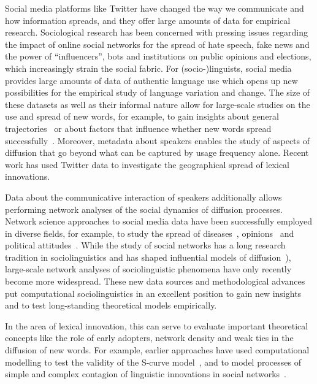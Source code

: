 \documentclass[
  a4paper,
  abstract=on,
  captions=tableabove
  ]{scrartcl}
\begin{document}
Social media platforms like Twitter have changed the way we communicate and how information spreads, and they offer large amounts of data for empirical research. Sociological research has been concerned with pressing issues regarding the impact of online social networks for the spread of hate speech, fake news and the power of \enquote{influencers}, bots and institutions on public opinions and elections, which increasingly strain the social fabric. For (socio-)linguists, social media provides large amounts of data of authentic language use which opens up new possibilities for the empirical study of language variation and change. The size of these datasets as well as their informal nature allow for large-scale studies on the use and spread of new words, for example, to gain insights about general trajectories~\parencite{Nini2017ApplicationGrowth} or about factors that influence whether new words spread successfully~\parencite{Grieve2018NaturalSelection}. Moreover, metadata about speakers enables the study of aspects of diffusion that go beyond what can be captured by usage frequency alone. Recent work has used Twitter data to investigate the geographical spread of lexical innovations.~\parencite{Eisenstein2014DiffusionLexical,Grieve2017GeographicalPatterns,Grieve2018MappingLexical}

Data about the communicative interaction of speakers additionally allows performing network analyses of the social dynamics of diffusion processes. Network science approaches to social media data have been successfully employed in diverse fields, for example, to study the spread of diseases~\parencite{Lu2018AccurateInfluenza}, opinions~\parencite{West2014ExploitingSocial} and political attitudes~\parencite{PewResearchCenter2019NationalPolitics}. While the study of social networks has a long research tradition in sociolinguistics and has shaped influential models of diffusion~\parencite[e.g.][]{Milroy1985LinguisticChange}), large-scale network analyses of sociolinguistic phenomena have only recently become more widespread. These new data sources and methodological advances put computational sociolinguistics in an excellent position to gain new insights and to test long-standing theoretical models empirically.

In the area of lexical innovation, this can serve to evaluate important theoretical concepts like the role of early adopters, network density and weak ties in the diffusion of new words. For example, earlier approaches have used computational modelling to test the validity of the S-curve model~\parencite{Blythe2012ScurvesMechanisms}, and to model processes of simple and complex contagion of linguistic innovations in social networks~\parencite{Goel2016SocialDynamics}.
\end{document}
